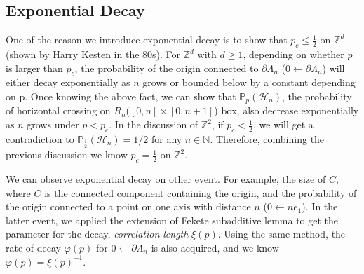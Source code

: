 \documentclass[12pt]{article}
\theoremstyle{plane}
\theoremstyle{definition}
\begin{document}
\subsection{Exponential Decay}\label{Course_Progress:Exponentia_Decay}
One of the reason we introduce exponential decay is to show that $p_c \leq \frac{1}{2}$ on $\mathbb{Z}^d$(shown by Harry Kesten in the 80s). 
For $\mathbb{Z}^d$ with $d\geq 1$, depending on whether $p$ is larger than $p_c$, the probability of the origin connected to $\partial \Lambda_n$  ($0 \longleftarrow \partial \Lambda_n$) will either decay exponentially as $n$ grows or bounded below by a constant depending on p. 
Once knowing the above fact, we can show that $\mathbb{P}_p (\mathcal{H}_n)$, the probability of horizontal crossing on $R_n$($[0,n]\times [0,n+1]$) box, also decrease exponentially as $n$ grows under $p < p_c$. 
In the discussion of $\mathbb{Z}^2$, if $p_c < \frac{1}{2}$, we will get a contradiction to $\mathbb{P}_{\frac{1}{2}}(\mathcal{H}_n) = 1/2$ for any $n \in \mathbb{N}$. Therefore, combining the previous discussion we know $p_c = \frac{1}{2}$ on $\mathbb{Z}^2$.

We can observe exponential decay on other event. For example, the size of $C$, where $C$ is the connected component containing the origin, and the probability of the origin connected to a point on one axis with distance $n$ ($0 \longleftarrow ne_1$). In the latter event, we applied the extension of Fekete subadditive lemma to get the parameter for the decay, \textit{correlation length} $\xi(p)$. 
Using the same method, the rate of decay $\varphi(p)$ for $0 \longleftarrow \partial \Lambda_n$ is also acquired, and we know $\varphi(p) = \xi(p)^{-1}$.

\end{document}
